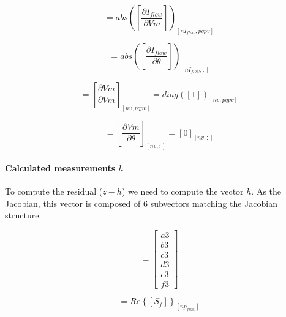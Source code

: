 \documentclass[nols,a4paper,twoside,symmetric,notoc,fleqn]{tufte-book}
\begin{document}

\begin{equation}
[E1] = abs\left(   \left[   \frac{\partial I_{flow}}{\partial Vm}  \right] \right)_{[nI_{flow}, pqpv]}
\end{equation}


\begin{equation}
[E2] = abs\left( \left[  \frac{\partial I_{flow}}{\partial \theta}  \right] \right)_{[nI_{flow}, :]}
\end{equation}

\begin{equation}
[F1] =  \left[  \frac{\partial Vm}{\partial Vm}  \right]_{[nv, pqpv]}  = diag([1])_{[nv, pqpv]}
\end{equation}


\begin{equation}
[F2] =  \left[  \frac{\partial Vm}{\partial \theta}  \right]_{[nv, :]}= [0]_{[nv, :]}
\end{equation}

\paragraph{Calculated measurements $h$}

To compute the residual ($z-h$) we need to compute the vector $h$. As the Jacobian, this vector is composed of 6 subvectors matching the Jacobian structure.

\begin{equation}
[h]=
\left[
\begin{array}{cc}
a3 \\
b3 \\
c3 \\
d3 \\
e3 \\
f3
\end{array}
\right]
\label{SE_measurements_vector}
\end{equation}


\begin{equation}
[a3] = Re\left\{[ S_f] \right\}_{[np_{flow}]}
\end{equation}
\end{document}
